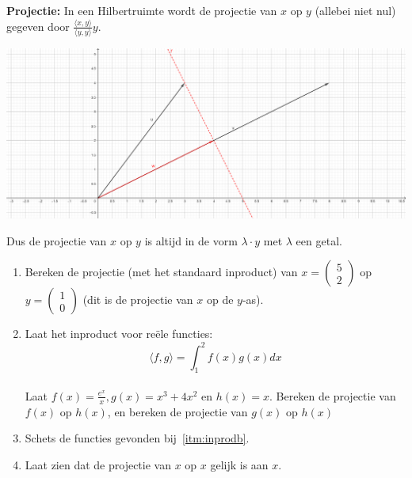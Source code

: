 \documentclass[../../main.tex]{subfiles}
\begin{document}
\textbf{Projectie:} In een Hilbertruimte wordt de projectie van $x$ op $y$ (allebei niet nul) gegeven door $\frac{\langle x,y\rangle}{\langle y,y\rangle}y$.

\begin{center}

    \includegraphics[width=\textwidth]{./img/projectie 1.png}
\end{center}
\vspace{.5cm}

Dus de projectie van $x$ op $y$ is altijd in de vorm $\lambda\cdot y$ met $\lambda$ een getal.

\begin{opdrachtlang}\label{opd:hilbproj}
\begin{enumerate}
\item Bereken de projectie (met het standaard inproduct) van $x=\begin{pmatrix}5\\2\end{pmatrix}$ op $y=\begin{pmatrix}1\\0\end{pmatrix}$ (dit is de projectie van $x$ op de $y$-as).\\
\item\label{itm:inprodb} Laat het inproduct voor reële functies:
\[\langle f,g\rangle=\int_{1}^2 f(x)g(x)dx\]\\
Laat $f(x)=\frac{e^x}{x},g(x)=x^3+4x^2$ en $h(x)=x$. Bereken de projectie van $f(x)$ op $h(x)$, en bereken de projectie van $g(x)$ op $h(x)$\\
\item Schets de functies gevonden bij~\ref{itm:inprodb}.\\
\item Laat zien dat de projectie van $x$ op $x$ gelijk is aan $x$. 
\end{enumerate}
\end{opdrachtlang}
\end{document}
